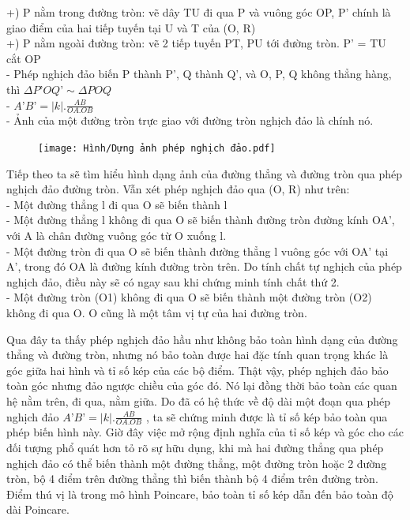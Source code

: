 \begin{multicols}{2}
	+) P nằm trong đường tròn: vẽ dây TU đi qua P và vuông góc OP, P’ chính là giao điểm của hai tiếp tuyến tại U và T của (O, R)\\
	+) P nằm ngoài đường tròn: vẽ 2 tiếp tuyến PT, PU tới đường tròn. P’ = TU cắt OP \\
	- Phép nghịch đảo biến P thành P’, Q thành Q’, và O, P, Q không thẳng hàng, thì $\Delta  P’OQ’ \sim  \Delta POQ$ \\
	- $A’B’ = |k|. \frac{AB}{OA.OB}$ \\
	- Ảnh của một đường tròn trực giao với đường tròn nghịch đảo là chính nó.
	
	\begin{figure}[ht]
		\texttt{[image: Hình/Dựng ảnh phép nghịch đảo.pdf]}
	\end{figure}
	
	Tiếp theo ta sẽ tìm hiểu hình dạng ảnh của đường thẳng và đường tròn qua phép nghịch đảo đường tròn. Vẫn xét phép nghịch đảo qua (O, R) như trên: \\
	- Một đường thẳng l đi qua O sẽ biến thành l \\
	- Một đường thẳng l không đi qua O sẽ biến thành  đường tròn đường kính OA’, với A là chân đường vuông góc từ O xuống l. \\ 
	- Một đường tròn đi qua O sẽ biến thành đường thẳng l vuông góc với OA’ tại A’, trong đó OA là đường kính đường tròn trên. Do tính chất tự nghịch của phép nghịch đảo, điều này sẽ có ngay sau khi chứng minh tính chất thứ 2. \\
	- Một đường tròn (O1) không đi qua O sẽ biến thành một đường tròn (O2) không đi qua O. O cũng là một tâm vị tự của hai đường tròn. 
	
	Qua đây ta thấy phép nghịch đảo hầu như không bảo toàn hình dạng của đường thẳng và đường tròn, nhưng nó bảo toàn được hai đặc tính quan trọng khác là góc giữa hai hình và tỉ số kép của các bộ điểm. Thật vậy, phép nghịch đảo bảo toàn góc nhưng đảo ngược chiều của góc đó. Nó lại đồng thời bảo toàn các quan hệ nằm trên, đi qua, nằm giữa. Do đã có hệ thức về độ dài một đoạn qua phép nghịch đảo  $A’B’ = |k|. \frac{AB}{OA.OB}$ , ta sẽ chứng minh được là tỉ số kép bảo toàn qua phép biến hình này. Giờ đây việc mở rộng định nghĩa của tỉ số kép và góc cho các đối tượng phổ quát hơn tỏ rõ sự hữu dụng, khi mà hai đường thẳng qua phép nghịch đảo có thể biến thành một đường thẳng, một đường tròn hoặc 2 đường tròn, bộ 4 điểm trên đường thẳng thì biến thành bộ 4 điểm trên đường tròn. Điểm thú vị là trong mô hình Poincare, bảo toàn tỉ số kép dẫn đến bảo toàn độ dài Poincare.
	

\end{multicols}
